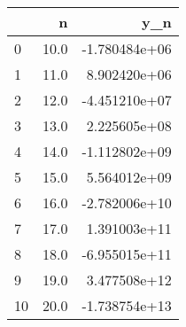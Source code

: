 \begin{tabular}{lrr}
\toprule
{} &     n &           y\_n \\
\midrule
0  &  10.0 & -1.780484e+06 \\
1  &  11.0 &  8.902420e+06 \\
2  &  12.0 & -4.451210e+07 \\
3  &  13.0 &  2.225605e+08 \\
4  &  14.0 & -1.112802e+09 \\
5  &  15.0 &  5.564012e+09 \\
6  &  16.0 & -2.782006e+10 \\
7  &  17.0 &  1.391003e+11 \\
8  &  18.0 & -6.955015e+11 \\
9  &  19.0 &  3.477508e+12 \\
10 &  20.0 & -1.738754e+13 \\
\bottomrule
\end{tabular}
